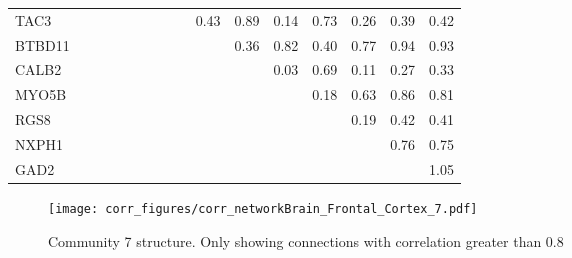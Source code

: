 \begin{longtable}{lrrrrrrrrrrrrrrr}
TAC3    &            &             &             &               &           &            &            &            &         0.43 &        0.89 &        0.14 &       0.73 &        0.26 &       0.39 &          0.42 \\
BTBD11  &            &             &             &               &           &            &            &            &              &        0.36 &        0.82 &       0.40 &        0.77 &       0.94 &          0.93 \\
CALB2   &            &             &             &               &           &            &            &            &              &             &        0.03 &       0.69 &        0.11 &       0.27 &          0.33 \\
MYO5B   &            &             &             &               &           &            &            &            &              &             &             &       0.18 &        0.63 &       0.86 &          0.81 \\
RGS8    &            &             &             &               &           &            &            &            &              &             &             &            &        0.19 &       0.42 &          0.41 \\
NXPH1   &            &             &             &               &           &            &            &            &              &             &             &            &             &       0.76 &          0.75 \\
GAD2    &            &             &             &               &           &            &            &            &              &             &             &            &             &            &          1.05 \\
\end{longtable}


\begin{figure}[h!]
\centering
\texttt{[image: corr\_figures/corr\_networkBrain\_Frontal\_Cortex\_7.pdf]}
\caption{Community 7 structure. Only showing connections with correlation greater than 0.8}
\end{figure}




